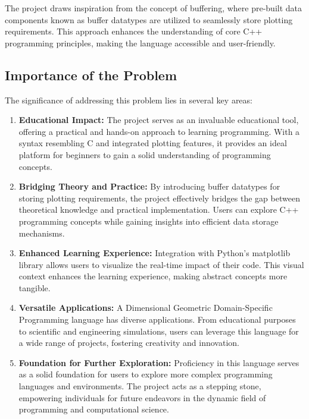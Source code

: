 \documentclass{article}
\begin{document}
The project draws inspiration from the concept of buffering, where pre-built data components known as buffer datatypes are utilized to seamlessly store plotting requirements. This approach enhances the understanding of core C++ programming principles, making the language accessible and user-friendly.

\subsection{Importance of the Problem}
The significance of addressing this problem lies in several key areas:

\begin{enumerate}
    \item \textbf{Educational Impact:} The project serves as an invaluable educational tool, offering a practical and hands-on approach to learning programming. With a syntax resembling C and integrated plotting features, it provides an ideal platform for beginners to gain a solid understanding of programming concepts.

    \item \textbf{Bridging Theory and Practice:} By introducing buffer datatypes for storing plotting requirements, the project effectively bridges the gap between theoretical knowledge and practical implementation. Users can explore C++ programming concepts while gaining insights into efficient data storage mechanisms.

    \item \textbf{Enhanced Learning Experience:} Integration with Python's matplotlib library allows users to visualize the real-time impact of their code. This visual context enhances the learning experience, making abstract concepts more tangible.

    \item \textbf{Versatile Applications:} A Dimensional Geometric Domain-Specific Programming language has diverse applications. From educational purposes to scientific and engineering simulations, users can leverage this language for a wide range of projects, fostering creativity and innovation.

    \item \textbf{Foundation for Further Exploration:} Proficiency in this language serves as a solid foundation for users to explore more complex programming languages and environments. The project acts as a stepping stone, empowering individuals for future endeavors in the dynamic field of programming and computational science.
\end{enumerate}
\end{document}

